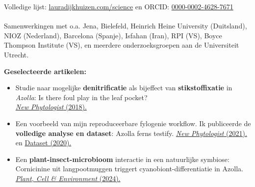 \documentclass[a4paper,10pt]{article}
\begin{document}

\noindent Volledige lijst: \href{https://lauradijkhuizen.com/science}{lauradijkhuizen.com/science} en
\noindent ORCID: \textcolor[HTML]{A6CE39}{\faOrcid}\href{https://orcid.org/0000-0002-4628-7671}{0000-0002-4628-7671}
\\\\
\noindent Samenwerkingen met o.a. Jena, Bielefeld, Heinrich Heine University (Duitsland), NIOZ (Nederland), Barcelona (Spanje), Isfahan (Iran), RPI (VS), Boyce Thompson Institute (VS), en meerdere onderzoeksgroepen aan de Universiteit Utrecht.

\vspace{0.5em}

\noindent \textbf{Geselecteerde artikelen:}
\begin{itemize}
  \setlength{\itemsep}{0em}

  \item Studie naar mogelijke \textbf{denitrificatie} als bijeffect van \textbf{stikstoffixatie} in \emph{Azolla}: 
    Is there foul play in the leaf pocket? \\
    {\null\hfill\footnotesize\href{https://doi.org/10.1111/nph.14843}{\emph{New Phytologist} (2018).}}

  \item Een voorbeeld van mijn reproduceerbare fylogenie workflow. Ik publiceerde de \textbf{volledige analyse en dataset}: Azolla ferns testify. 
    {\null\hfill\footnotesize \href{https://doi.org/10.1111/nph.16896}{\emph{New Phytologist} (2021).}  en
    \href{https://doi.org/10.5281/zenodo.3959057}{Dataset (2020).}}

  \item Een \textbf{plant-insect-microbioom} interactie in een natuurlijke symbiose: Cornicinine uit langpootmuggen triggert cyanobiont-differentiatie in Azolla.
    {\null\hfill\footnotesize\href{https://doi.org/10.1111/pce.14907}{\emph{Plant, Cell \& Environment} (2024).}    \null}
\end{itemize}

\vfill
\end{document}
